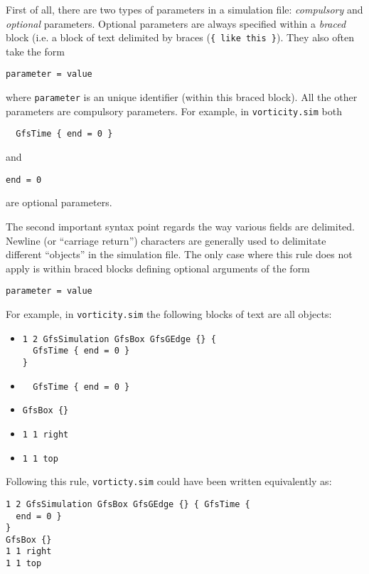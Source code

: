 \documentclass[a4paper]{article}
\begin{document}
First of all, there are two types of parameters in a simulation file:
{\em compulsory} and {\em optional} parameters. Optional parameters
are always specified within a {\em braced} block (i.e. a block of text 
delimited by braces ({\tt \{ like this \}}). They also often take the form
\begin{verbatim}
parameter = value
\end{verbatim}
where {\tt parameter} is an unique identifier (within this braced
block). All the other parameters are compulsory parameters.
For example, in {\tt vorticity.sim} both
\begin{verbatim}
  GfsTime { end = 0 }
\end{verbatim}
and
\begin{verbatim}
end = 0
\end{verbatim}
are optional parameters.

The second important syntax point regards the way various fields are
delimited. Newline (or ``carriage return'') characters are generally used to
delimitate different ``objects'' in the simulation file. The only
case where this rule does not apply is within braced blocks defining
optional arguments of the form
\begin{verbatim}
parameter = value
\end{verbatim}
For example, in {\tt vorticity.sim} the following blocks of text are
all objects:
\begin{itemize}
\item
\begin{verbatim}
1 2 GfsSimulation GfsBox GfsGEdge {} {
  GfsTime { end = 0 }
}
\end{verbatim}
\item
\begin{verbatim}
  GfsTime { end = 0 }
\end{verbatim}
\item
\begin{verbatim}
GfsBox {}
\end{verbatim}
\item
\begin{verbatim}
1 1 right
\end{verbatim}
\item
\begin{verbatim}
1 1 top
\end{verbatim}
\end{itemize}
Following this rule, {\tt vorticty.sim} could have been written
equivalently as:
\begin{verbatim}
1 2 GfsSimulation GfsBox GfsGEdge {} { GfsTime {
  end = 0 }
}
GfsBox {}
1 1 right
1 1 top
\end{verbatim}
\end{document}

